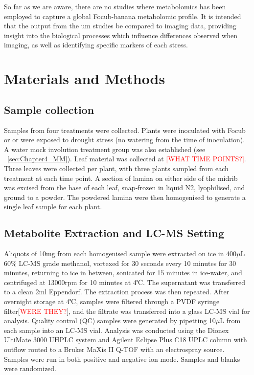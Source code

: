 So far as we are aware, there are no studies where metabolomics has been employed to capture a global \ac{Focub}-banana metabolomic profile. It is intended that the output from the \ac{um} studies be compared to imaging data, providing insight into the biological processes which influence differences observed when imaging, as well as identifying specific markers of each stress.

\newpage
\section{Materials and Methods}

\subsection{Sample collection}
Samples from four treatments were collected. Plants were inoculated with \ac{Focub} or \Xvm or were exposed to drought stress (no watering from the time of inoculation). A water mock involution treatment group was also established (see ~\ref{sec:Chapter4_MM}). 
Leaf material was collected at \textcolor{red}{[WHAT TIME POINTS?]}. Three leaves were collected per plant, with three plants sampled from each treatment at each time point. A section of lamina on either side of the midrib was excised from the base of each leaf, snap-frozen in liquid N2, lyophilised, and ground to a powder. The powdered lamina were then homogenised to generate a single leaf sample for each plant. 

\subsection{Metabolite Extraction and LC-MS Setting}
Aliquots of 10mg from each homogenised sample were extracted on ice in 400\(\mu\)L 60\% LC-MS grade methanol, vortexed for 30 seconds every 10 minutes for 30 minutes, returning to ice in between, sonicated for 15 minutes in ice-water, and centrifuged at 13000rpm for 10 minutes at 4℃. The supernatant was transferred to a clean 2ml Eppendorf. The extraction process was then repeated. After overnight storage at 4℃, samples were filtered through a PVDF syringe filter[\textcolor{red}{WERE THEY?}], and the filtrate was transferred into a glass LC-MS vial for analysis. Quality control (QC) samples were generated by pipetting 10\(\mu\)L from each sample into an LC-MS vial. Analysis was conducted using the Dionex UltiMate 3000 UHPLC system and Agilent Eclipse Plus C18 UPLC column with outflow routed to a Bruker MaXis II Q-TOF with an electrospray source. Samples were run in both positive and negative ion mode. Samples and blanks were randomized.


